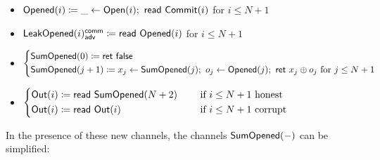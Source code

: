 \begin{itemize}
\item {\color{red} $\mathsf{Opened}(i) \coloneqq \_ \leftarrow \mathsf{Open}(i); \ \mathsf{read} \ \mathsf{Commit}(i)$ for $i \leq N+1$}
\item {\color{red} $\mathsf{LeakOpened}(i)^{\mathsf{comm}}_{\mathsf{adv}} \coloneqq \mathsf{read} \ \mathsf{Opened}(i)$ for $i \leq N+1$}
\item {\color{red} $\begin{cases*} \SumOpened(0) \coloneqq \ret{\false} \\ \SumOpened(j+1) \coloneqq x_j \leftarrow \SumOpened(j); \ o_j \leftarrow \Opened(j); \ \ret{x_j \oplus o_j} \text{ for $j \leq N+1$} \end{cases*}$}
\item $\begin{cases*} \Out(i) \coloneqq \read{\SumOpened(N+2)} & \hspace{10pt} \text{if $i \leq N+1$ honest} \\ \Out(i) \coloneqq \read{\Out(i)} & \hspace{10pt} \text{if $i \leq N+1$ corrupt} \end{cases*}$
\end{itemize}

\noindent In the presence of these new channels, the channels $\mathsf{SumOpened}(-)$ can be simplified:

